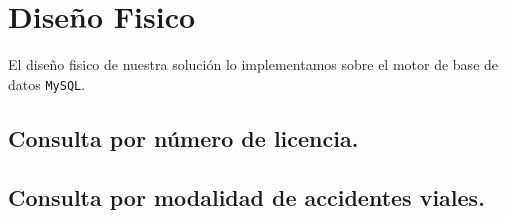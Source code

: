 \section{Diseño Fisico}

El diseño fisico de nuestra solución lo implementamos sobre el motor de base de datos \texttt{MySQL}.

\subsection{Consulta por número de licencia.}



\subsection{Consulta por modalidad de accidentes viales.}

